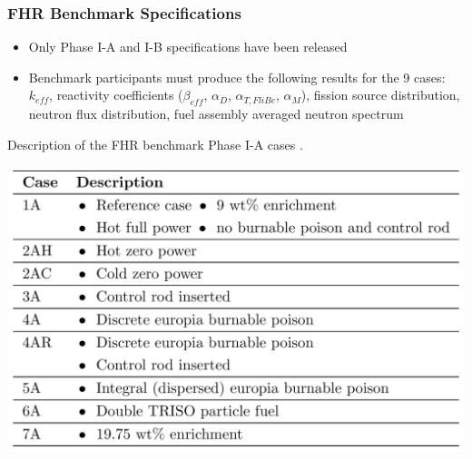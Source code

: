 \begin{frame}
    \frametitle{FHR Benchmark Specifications}
    \begin{itemize}
        \item Only Phase I-A and I-B specifications have been released 
        \item Benchmark participants must produce the following results for 
        the 9 cases: $k_{eff}$, reactivity coefficients ($\beta_{eff}$, 
        $\alpha_D$, $\alpha_{T, FliBe}$, $\alpha_M$), fission source distribution, 
        neutron flux distribution, fuel assembly averaged neutron spectrum
    \end{itemize}
    \vspace{-0.25cm}
    \begin{table}
        \caption{Description of the \acrlong{FHR} benchmark Phase I-A cases 
        \vspace{-0.25cm}
        \cite{noauthor_fluoride_nodate}.}
        \includegraphics[width=0.6\linewidth]{figures/benchmark-cases.png} 
    \end{table}
\end{frame}